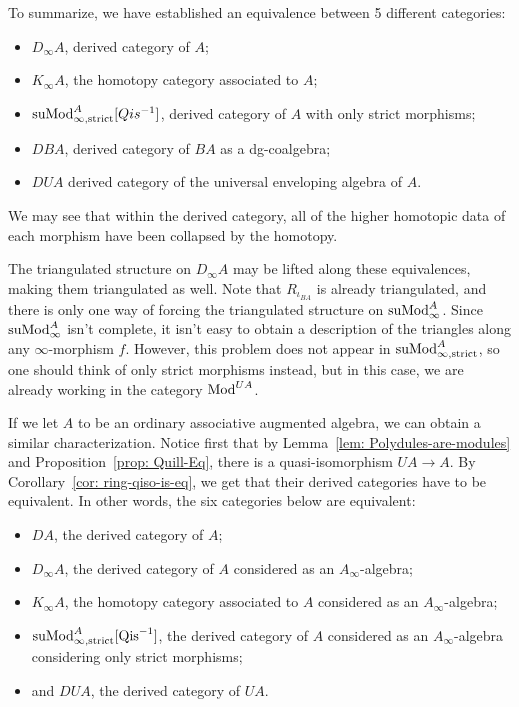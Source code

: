 \documentclass[../thesis.tex]{subfiles}
\begin{document}
            To summarize, we have established an equivalence between 5 different categories:
            \begin{itemize}
                \item $D_\infty A$, derived category of $A$;
                \item $K_\infty A$, the homotopy category associated to $A$;
                \item $\tt{suMod}_{\infty, \tt{strict}}^A[Qis^{-1}]$, derived category of $A$ with only strict morphisms;
                \item $DBA$, derived category of $BA$ as a dg-coalgebra;
                \item $DUA$ derived category of the universal enveloping algebra of $A$.
            \end{itemize}

            We may see that within the derived category, all of the higher homotopic data of each morphism have been collapsed by the homotopy.

            The triangulated structure on $D_\infty A$ may be lifted along these equivalences, making them triangulated as well. Note that $R_{\iota_{BA}}$ is already triangulated, and there is only one way of forcing the triangulated structure on $\tt{suMod}_\infty^A$. Since $\tt{suMod}_{\infty}^A$ isn't complete, it isn't easy to obtain a description of the triangles along any $\infty$-morphism $f$. However, this problem does not appear in $\tt{suMod}_{\infty, \tt{strict}}^A$, so one should think of only strict morphisms instead, but in this case, we are already working in the category $\tt{Mod}^{UA}$. 

            If we let $A$ to be an ordinary associative augmented algebra, we can obtain a similar characterization. Notice first that by Lemma~\ref{lem: Polydules-are-modules} and Proposition~\ref{prop: Quill-Eq}, there is a quasi-isomorphism $UA \rightarrow A$. By Corollary~\ref{cor: ring-qiso-is-eq}, we get that their derived categories have to be equivalent. In other words, the six categories below are equivalent:
            \begin{itemize}
                \item $DA$, the derived category of $A$;
                \item $D_\infty A$, the derived category of $A$ considered as an $A_\infty$-algebra;
                \item $K_\infty A$, the homotopy category associated to $A$ considered as an $A_\infty$-algebra;
                \item $\tt{suMod}^A_{\infty, \tt{strict}}[\tt{Qis}^{-1}]$, the derived category of $A$ considered as an $A_\infty$-algebra considering only strict morphisms;
                \item and $DUA$, the derived category of $UA$.
            \end{itemize}
\end{document}
